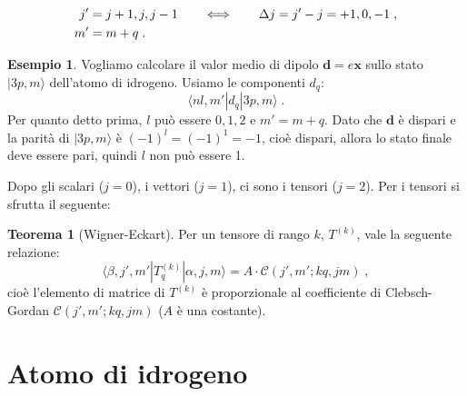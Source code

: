 \documentclass[10pt,a4paper]{report}
\theoremstyle{definition}
\newtheorem{thm}{Teorema}[section]
\newtheorem{exm}{Esempio}
\numberwithin{equation}{section}
\newcommand{\bra}{\langle}
\newcommand{\ket}{\rangle}
\begin{document}
\begin{align}
j'&=j+1,j,j-1 \qquad \Longleftrightarrow \qquad \Delta j=j'-j=+1,0,-1 \notag\;, \\
m'&= m+q\;.
\end{align}
\begin{exm}
Vogliamo calcolare il valor medio di dipolo $\mathbf{d}=e\mathbf{x}$ sullo stato $|3p,m\ket$ dell'atomo di idrogeno. Usiamo le componenti $d_q$:
\begin{equation}
\bra nl,m'|d_q|3p,m\ket\;.
\end{equation}
Per quanto detto prima, $l$ può essere $0,1,2$ e $m'=m+q$. Dato che $\mathbf{d}$ è dispari e la parità di $|3p,m\ket$ è $(-1)^l=(-1)^1=-1$, cioè dispari, allora lo stato finale deve essere pari, quindi $l$ non può essere 1.
\end{exm}
Dopo gli scalari ($j=0$), i vettori ($j=1$), ci sono i tensori ($j=2$). Per i tensori si sfrutta il seguente:
\begin{thm}[Wigner-Eckart] Per un tensore di rango $k$, $T^{(k)}$, vale la seguente relazione:
\begin{equation}
\bra \beta,j',m'|T_q^{(k)}|\alpha,j,m\ket =A\cdot \mathcal{C}(j',m';kq,jm)\;,
\end{equation}
cioè l'elemento di matrice di $T^{(k)}$ è proporzionale al coefficiente di Clebsch-Gordan $\mathcal{C}(j',m';kq,jm)$ ($A$ è una costante).
\end{thm}
\chapter{Atomo di idrogeno}
\end{document}
